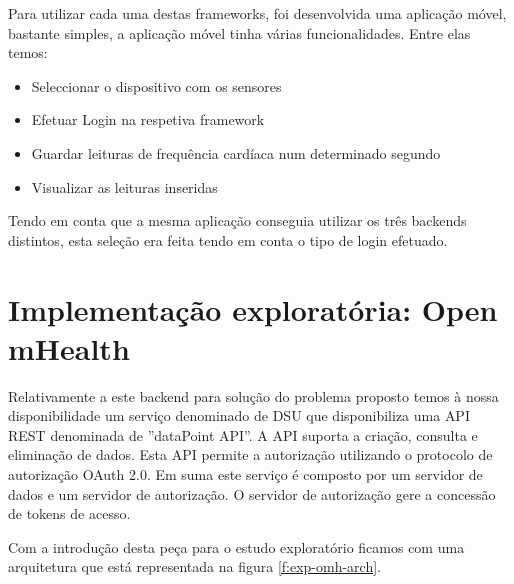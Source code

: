 Para utilizar cada uma destas frameworks, foi desenvolvida uma aplicação móvel, bastante simples, a aplicação móvel tinha várias funcionalidades. Entre elas temos:
\begin{itemize}
  \item Seleccionar o dispositivo com os sensores
  \item Efetuar Login na respetiva framework
  \item Guardar leituras de frequência cardíaca num determinado segundo
  \item Visualizar as leituras inseridas
\end{itemize}

Tendo em conta que a mesma aplicação conseguia utilizar os três backends distintos, esta seleção era feita tendo em conta o tipo de login efetuado.


\section{Implementação exploratória: Open mHealth}
Relativamente a este backend para solução do problema proposto temos à nossa disponibilidade um serviço denominado de \gls{DSU} que disponibiliza uma \gls{API} \gls{REST} denominada de ''dataPoint API''. A \gls{API} suporta a criação, consulta e eliminação de dados. Esta \gls{API} permite a autorização utilizando o protocolo de autorização OAuth 2.0. Em suma este serviço é composto por um servidor de dados e um servidor de autorização. O servidor de autorização gere a concessão de tokens de acesso. \cite{omhstorage} \par
Com a introdução desta peça para o estudo exploratório ficamos com uma arquitetura que está representada na figura \ref{f:exp-omh-arch}.

